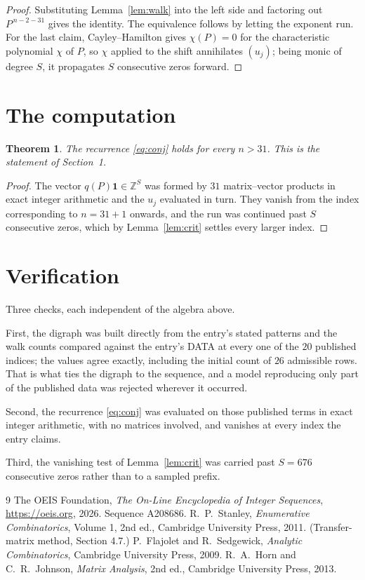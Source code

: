 \documentclass[11pt,a4paper]{article}
\theoremstyle{plain}
\newtheorem{theorem}{Theorem}
\theoremstyle{definition}
\begin{document}
\begin{proof}
Substituting Lemma~\ref{lem:walk} into the left side and factoring out
$P^{\,n-2-31}$ gives the identity. The equivalence follows by letting the exponent
run. For the last claim, Cayley--Hamilton gives $\chi(P)=0$ for the characteristic
polynomial $\chi$ of $P$, so $\chi$ applied to the shift annihilates $(u_j)$; being monic of
degree $S$, it propagates $S$ consecutive zeros forward.
\end{proof}

\section{The computation}

\begin{theorem}
The recurrence \eqref{eq:conj} holds for every $n>31$. This is the statement of
Section~1.
\end{theorem}

\begin{proof}
The vector $q(P)\mathbf{1}\in\mathbb{Z}^{S}$ was formed by $31$ matrix--vector
products in exact integer arithmetic and the $u_j$ evaluated in turn. They vanish from the
index corresponding to $n=31+1$ onwards, and the run was continued past $S$ consecutive
zeros, which by Lemma~\ref{lem:crit} settles every larger index.
\end{proof}

\section{Verification}

Three checks, each independent of the algebra above.

First, the digraph was built directly from the entry's stated patterns and the walk counts
compared against the entry's DATA at every one of the $20$ published indices; the
values agree exactly, including the initial count of $26$ admissible rows. That is
what ties the digraph to the sequence, and a model reproducing only part of the published
data was rejected wherever it occurred.

Second, the recurrence \eqref{eq:conj} was evaluated on those published terms in exact
integer arithmetic, with no matrices involved, and vanishes at every index the entry claims.

Third, the vanishing test of Lemma~\ref{lem:crit} was carried past $S=676$ consecutive
zeros rather than to a sampled prefix.

\begin{thebibliography}{9}
 The OEIS Foundation, \emph{The On-Line Encyclopedia of Integer
Sequences}, \url{https://oeis.org}, 2026. Sequence A208686.
 R.~P.~Stanley, \emph{Enumerative Combinatorics}, Volume 1, 2nd ed.,
Cambridge University Press, 2011. (Transfer-matrix method, Section 4.7.)
 P.~Flajolet and R.~Sedgewick, \emph{Analytic Combinatorics}, Cambridge
University Press, 2009.
 R.~A.~Horn and C.~R.~Johnson, \emph{Matrix Analysis}, 2nd ed., Cambridge
University Press, 2013.
\end{thebibliography}
\end{document}
